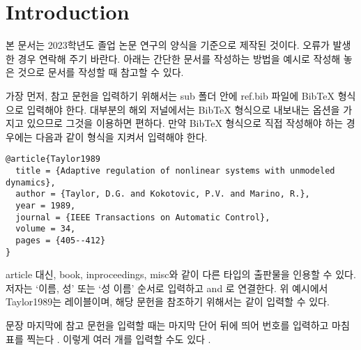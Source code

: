 \section{Introduction}
본 문서는 2023학년도 졸업 논문 연구의 양식을 기준으로 제작된 것이다. 오류가 발생한 경우 연락해 주기 바란다. 아래는 간단한 문서를 작성하는 방법을 예시로 작성해 놓은 것으로 문서를 작성할 때 참고할 수 있다.

가장 먼저, 참고 문헌을 입력하기 위해서는 sub 폴더 안에 ref.bib 파일에 BibTeX 형식으로 입력해야 한다. 대부분의 해외 저널에서는 BibTeX 형식으로 내보내는 옵션을 가지고 있으므로 그것을 이용하면 편하다. 만약 BibTeX 형식으로 직접 작성해야 하는 경우에는 다음과 같이 형식을 지켜서 입력해야 한다.

\begin{verbatim}
@article{Taylor1989
  title = {Adaptive regulation of nonlinear systems with unmodeled dynamics},
  author = {Taylor, D.G. and Kokotovic, P.V. and Marino, R.},
  year = 1989,
  journal = {IEEE Transactions on Automatic Control},
  volume = 34,
  pages = {405--412}
}
\end{verbatim}

article 대신, book, inproceedings, misc와 같이 다른 타입의 출판물을 인용할 수 있다. 저자는 `이름, 성' 또는 `성 이름' 순서로 입력하고 and 로 연결한다. 위 예시에서 Taylor1989는 레이블이며, 해당 문헌을 참조하기 위해서는 \cite{Taylor1989}\와 같이 입력할 수 있다.

문장 마지막에 참고 문헌을 입력할 때는 마지막 단어 뒤에 띄어 번호를 입력하고 마침표를 찍는다 \cite{aksin}. 이렇게 여러 개를 입력할 수도 있다 \cite{bertram, Intel1988, Knuth1984, Amaro-Seoane2012}.
